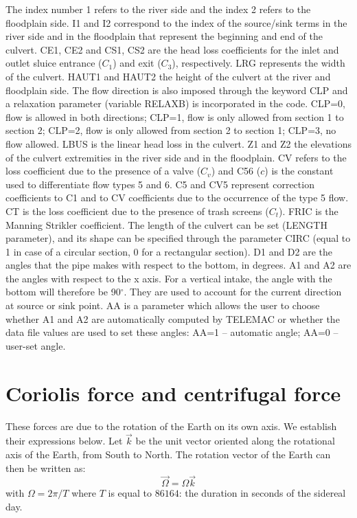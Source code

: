 The index number 1 refers to the river side and the index 2 refers to the floodplain side.
I1 and I2 correspond to the index of the source/sink terms in the river side
and in the floodplain that represent the beginning and end of the culvert.
CE1, CE2 and CS1, CS2 are the head loss coefficients
for the inlet and outlet sluice entrance ($C_1$) and exit ($C_3$), respectively.
LRG represents the width of the culvert.
HAUT1 and HAUT2 the height of the culvert at the river and
floodplain side.
The flow direction is also imposed through the keyword CLP and
a relaxation parameter (variable RELAXB) is incorporated in the code.
CLP=0, flow is allowed in both directions; CLP=1, flow is only allowed from section 1 to section 2; CLP=2, flow is only allowed from section 2 to section 1; CLP=3, no flow allowed.
LBUS is the linear head loss in the culvert.
Z1 and Z2 the elevations of the culvert
extremities in the river side and in the floodplain.
CV refers to the loss coefficient due to the presence of a valve ($C_v$) and
C56 ($c$) is the constant used to differentiate flow types 5 and 6.
C5 and CV5 represent correction coefficients to C1 and to CV coefficients
due to the occurrence of the type 5 flow.
CT is the loss coefficient due to the presence of trash screens ($C_t$).
FRIC is the Manning Strikler coefficient.
The length of the culvert can be set (LENGTH parameter), and its shape can be specified through the parameter CIRC (equal to 1 in
case of a circular section, 0 for a rectangular section).
D1 and D2 are the angles that the pipe makes with respect to the bottom, in degrees.
A1 and A2 are the angles with respect to the x axis.
For a vertical intake, the angle with the bottom will therefore be 90${}^\circ$.
They are used to account for the current direction at source or sink point.
AA is a parameter which allows the user to choose whether A1 and A2 are automatically computed by TELEMAC
or whether the data file values are used to set these angles: AA=1 -- automatic angle; AA=0 -- user-set angle.
\section{\label{sec:coriolis}Coriolis%
force and centrifugal force%
%
}
These forces are due to the rotation of the Earth on its own axis. We
establish their expressions below. Let $\vec{k}$ be the unit vector oriented
along the rotational axis of the Earth, from South to North. The rotation
vector of the Earth can then be written as:
\begin{equation}
\vec{\Omega}=\Omega\vec{k}
\end{equation}
with $\Omega= 2\pi/T$ where $T$ is equal to $86164$: the duration in seconds of the
sidereal day.\\

